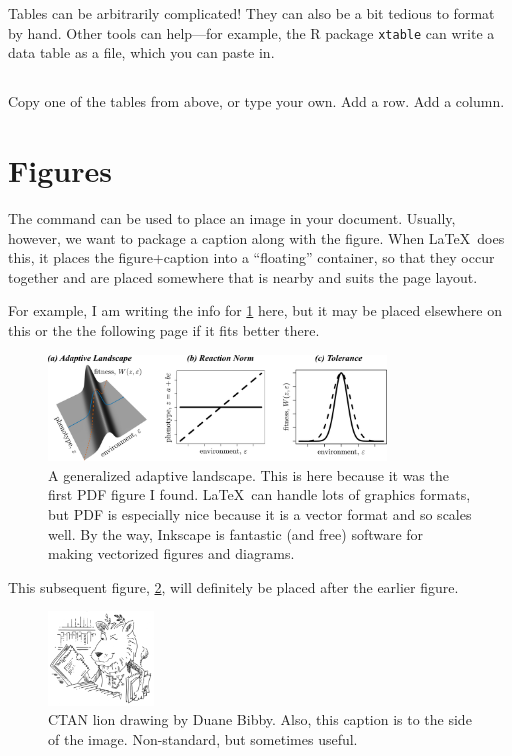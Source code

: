 \documentclass{article}
\begin{document}
Tables can be arbitrarily complicated!
They can also be a bit tedious to format by hand.
Other tools can help---for example, the R package \texttt{xtable} can write a data table as a  file, which you can paste in.

\subsection*{\task}

Copy one of the tables from above, or type your own.
Add a row.
Add a column.

\section{Figures}
\label{sec:figures}

The  command can be used to place an image in your document.
Usually, however, we want to package a caption along with the figure.
When \LaTeX\ does this, it places the figure+caption into a ``floating'' container, so that they occur together and are placed somewhere that is nearby and suits the page layout.

For example, I am writing the info for \cref{fig:landscape} here, but it may be placed elsewhere on this or the the following page if it fits better there.
\begin{figure}
\centering\includegraphics[width=0.8\textwidth]{landscape.pdf}
\caption{A generalized adaptive landscape.
    This is here because it was the first PDF figure I found.
    \LaTeX\ can handle lots of graphics formats, but PDF is especially nice because it is a vector format and so scales well.
    By the way, Inkscape is fantastic (and free) software for making vectorized figures and diagrams.
}
\label{fig:landscape}
\end{figure}

This subsequent figure, \cref{fig:lion}, will definitely be placed after the earlier figure.
\begin{figure}
\includegraphics[width=0.25\textwidth]{lion.png}
\caption{CTAN lion drawing by Duane Bibby.
    Also, this caption is to the side of the image.
    Non-standard, but sometimes useful.
}
\label{fig:lion}
\end{figure}
\end{document}

